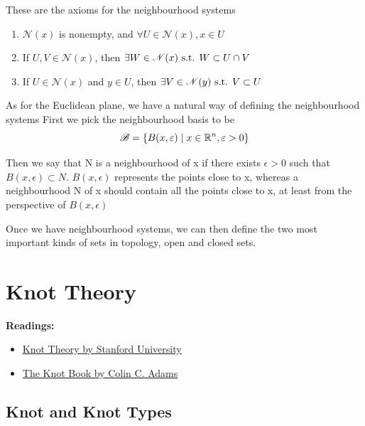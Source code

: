 These are the axioms for the neighbourhood systems
\begin{enumerate}
\item $\mathscr{N}(x)$ is nonempty, and $\forall U \in \mathscr{N}(x), x \in U$
\item If $U,V \in \mathscr{N}(x)$, then $\exists W \in \mathscr{N}(x) \text{ s.t. } W \subset U \cap V$
\item If $U \in \mathscr{N}(x)$ and $y \in U$, then $\exists V \in \mathscr{N}(y) \text{ s.t. } V \subset U$
\end{enumerate}

As for the Euclidean plane, we have a natural way of defining the neighbourhood systems
First we pick the neighbourhood basis to be
\[ \mathscr{B} = \{B(x,\varepsilon) \mid x \in \mathbb R^n,\varepsilon>0\} \]

Then we say that N is a neighbourhood of x if there exists $\epsilon>0$ such that $B(x,\epsilon) \subset N$. 
$B(x,\epsilon)$ represents the points close to x, whereas a neighbourhood N of x should contain all the points close to x, at least from the perspective of $B(x,\epsilon)$

Once we have neighbourhood systems, we can then define the two most important kinds of sets in topology, open and closed sets.


\chapter{Knot Theory}
\textbf{Readings:}
\begin{itemize}
\item \href{https://stanford.edu/~sfh/knot.pdf}{Knot Theory by Stanford University}
\item \href{https://www.math.cuhk.edu.hk/course_builder/1920/math4900e/Adams--The%20Knot%20Book.pdf}{The Knot Book by Colin C. Adams}
\end{itemize}

\section{Knot and Knot Types}
